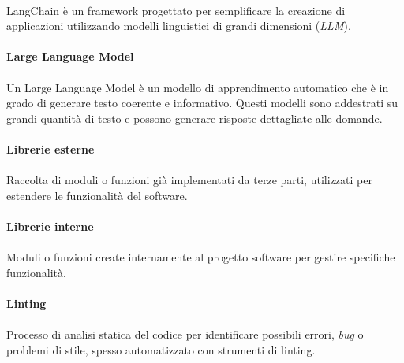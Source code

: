 \documentclass[10pt, a4paper]{article}
\begin{document}
\paragraph{}LangChain è un framework progettato per semplificare la creazione di applicazioni utilizzando modelli linguistici di grandi dimensioni (\textit{LLM\pg}).

\vspace{2em}
\paragraph{Large Language Model}\noindent\hrulefill
\paragraph{}Un Large Language Model è un modello di apprendimento automatico che è in grado di generare testo coerente e informativo. Questi modelli sono addestrati su grandi quantità di testo e possono generare risposte dettagliate alle domande.

\vspace{2em}
\paragraph{Librerie esterne}\noindent\hrulefill
\paragraph{}Raccolta di moduli o funzioni già implementati da terze parti, utilizzati per estendere le funzionalità del software.

\vspace{2em}
\paragraph{Librerie interne}\noindent\hrulefill
\paragraph{}Moduli o funzioni create internamente al progetto software per gestire specifiche funzionalità.

\vspace{2em}
\paragraph{Linting}\noindent\hrulefill
\paragraph{}Processo di analisi statica del codice per identificare possibili errori, \textit{bug\pg} o problemi di stile, spesso automatizzato con strumenti di linting.
\end{document}

